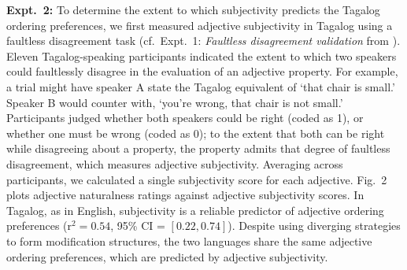 \documentclass[10pt]{article}
\begin{document}
\textbf{Expt.~2:} To determine the extent to which subjectivity predicts the Tagalog ordering preferences, we first measured adjective subjectivity in Tagalog using a faultless disagreement task (cf.~Expt.~1: \emph{Faultless disagreement validation} from \citeauthor{scontrasetal2017adjectives}). Eleven Tagalog-speaking participants indicated the extent to which two speakers could faultlessly disagree in the evaluation of an adjective property. For example, a trial might have speaker A state the Tagalog equivalent of `that chair is small.' Speaker B would counter with, `you're wrong, that chair is not small.' Participants judged whether both speakers could be right (coded as 1), or whether one must be wrong (coded as 0); to the extent that both can be right while disagreeing about a property, the property admits that degree of faultless disagreement, which measures adjective subjectivity. Averaging across participants, we calculated a single subjectivity score for each adjective. Fig.~2 plots adjective naturalness ratings against adjective subjectivity scores. In Tagalog, as in English, subjectivity is a reliable predictor of adjective ordering preferences (r$^2 = 0.54$, 95\% CI = $[0.22,0.74]$). Despite using diverging strategies to form modification structures, the two languages share the same adjective ordering preferences, which are predicted by adjective subjectivity.\\

\vfill
\end{document}
